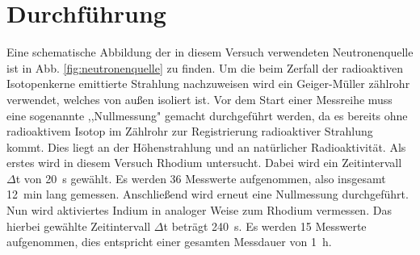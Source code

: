 
\section{Durchführung}
Eine schematische Abbildung der in diesem Versuch verwendeten Neutronenquelle ist in Abb. \ref{fig:neutronenquelle} zu finden. Um die beim Zerfall der radioaktiven Isotopenkerne emittierte Strahlung nachzuweisen wird ein Geiger-Müller zählrohr verwendet, welches von außen isoliert ist. Vor dem Start einer Messreihe muss eine sogenannte ,,Nullmessung" gemacht durchgeführt werden, da es bereits ohne radioaktivem Isotop im Zählrohr zur Registrierung radioaktiver Strahlung kommt. Dies liegt an der Höhenstrahlung und an natürlicher Radioaktivität.
Als erstes wird in diesem Versuch Rhodium untersucht. Dabei wird ein Zeitintervall $\Delta$t von \SI{20}{\second} gewählt. Es werden 36 Messwerte aufgenommen, also insgesamt \SI{12}{\minute} lang gemessen. 
Anschließend wird erneut eine Nullmessung durchgeführt. Nun wird aktiviertes Indium in analoger Weise zum Rhodium vermessen. Das hierbei gewählte Zeitintervall $\Delta$t beträgt \SI{240}{\second}. Es werden 15 Messwerte aufgenommen, dies entspricht einer gesamten Messdauer von \SI{1}{\hour}.
